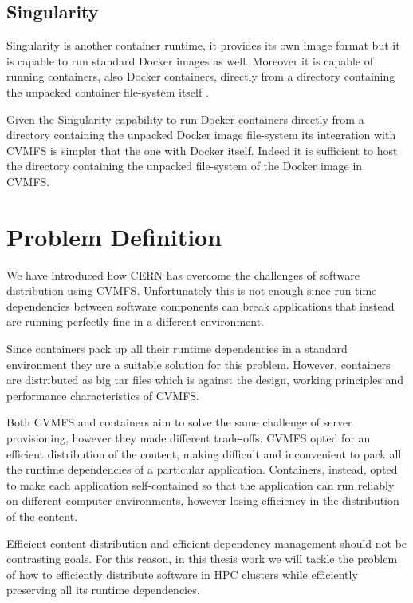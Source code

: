 \subsection{Singularity}\label{subsec:singularity}

Singularity \citep{singularity:home} is another container runtime, it provides
its own image format but it is capable to run standard Docker images
\cite{singularity:docker} as well.  Moreover it is capable of running
containers, also Docker containers, directly from a directory containing the
unpacked container file-system itself \cite{singularity:run}.

Given the Singularity capability to run Docker containers directly from a
directory containing the unpacked Docker image file-system its integration with
CVMFS is simpler that the one with Docker itself. Indeed it is sufficient to
host the directory containing the unpacked file-system of the Docker image in
CVMFS.

\section{Problem Definition}\label{sec:problem}

We have introduced how CERN has overcome the challenges of software distribution
using CVMFS. Unfortunately this is not enough since run-time dependencies
between software components can break applications that instead are running
perfectly fine in a different environment.

Since containers pack up all their runtime dependencies in a standard
environment they are a suitable solution for this problem. However, containers
are distributed as big tar files which is against the design, working
principles and performance characteristics of CVMFS.

Both CVMFS and containers aim to solve the same challenge of server
provisioning, however they made different trade-offs. CVMFS opted for an
efficient distribution of the content, making difficult and
inconvenient to pack all the runtime dependencies of a particular application.
Containers, instead, opted to make each application self-contained so that the
application can run reliably on different computer environments, however
losing efficiency in the distribution of the content.

Efficient content distribution and efficient dependency management should not
be contrasting goals. For this reason, in this thesis work we will tackle the
problem of how to efficiently distribute software in HPC clusters while
efficiently preserving all its runtime dependencies.


